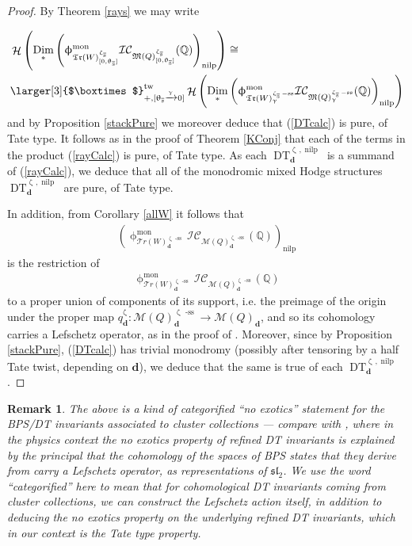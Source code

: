 \documentclass[a4paper,10pt]{amsart}
\newtheorem{remark}[theorem]{Remark}
\newcommand{\dd}{\mathbf{d}}
\newcommand{\Boxtimes}{\mbox{\larger[3]{$\boxtimes$}}}
\newcommand{\QQ}{\mathbb{Q}}
\newcommand{\WW}{\mathcal{T}r(W)}
\newcommand{\WWW}{\mathfrak{Tr}(W)}
\newcommand{\Mst}{\mathfrak{M}}
\newcommand{\Msp}{\mathcal{M}}
\newcommand{\ICS}{\mathcal{IC}}
\newcommand{\phim}[1]{\phi^{\mon}_{#1}}
\renewcommand{\theta}{\uptheta}
\renewcommand{\gamma}{\upgamma}
\renewcommand{\zeta}{\upzeta}
\renewcommand{\phi}{\upphi}
\DeclareMathOperator{\sst}{-ss}
\DeclareMathOperator{\nilp}{nilp}
\DeclareMathOperator{\Dim}{Dim}
\DeclareMathOperator{\tw}{tw}
\DeclareMathOperator{\mon}{mon}
\DeclareMathOperator{\DT}{DT}
\DeclareMathOperator{\Ss}{\overline{s}}
\DeclareMathOperator{\Ho}{\mathcal{H}}
\begin{document}
\begin{proof}
By Theorem \ref{rays} we may write

\begin{align}\label{DTcalc}
&\Ho\left(\Dim_*\left(\phim{\WWW^{\zeta_{\Ss}}_{[0,\theta_{\Ss}]}}\ICS_{\Mst(Q)_{[0,\theta_{\Ss}]}^{\zeta_{\Ss}}}(\mathbb{Q})\right)_{\nilp}\right)\cong\\&\Boxtimes_{+,[\theta_{\Ss}\xrightarrow{\gamma}0]}^{\tw}\Ho\left(\Dim_*\left(\phim{\WWW^{\zeta_{\Ss}\sst}_{\gamma}}\ICS_{\Mst(Q)^{\zeta_{\Ss}\sst}_{\gamma}}(\mathbb{Q})\right)_{\nilp}\right)\label{rayCalc}
\end{align}
and by Proposition \ref{stackPure} we moreover deduce that (\ref{DTcalc}) is pure, of Tate type.  It follows as in the proof of Theorem \ref{KConj} that each of the terms in the product (\ref{rayCalc}) is pure, of Tate type.  As each $\DT_{\dd}^{\zeta_{\Ss},\nilp}$ is a summand of (\ref{rayCalc}), we deduce that all of the monodromic mixed Hodge structures $\DT_{\dd}^{\zeta_{\Ss},\nilp}$ are pure, of Tate type.  

In addition, from Corollary \ref{allW} it follows that 
\begin{align*}
\left(\phim{\WW^{\zeta_{\Ss}\sst}_{\dd}}\ICS_{\Msp(Q)_{\dd}^{\zeta_{\Ss}\sst}}(\QQ)\right)_{\nilp}
\end{align*}
is the restriction of 
\begin{align*}
\phim{\WW^{\zeta_{\Ss}\sst}_{\dd}}\ICS_{\Msp(Q)_{\dd}^{\zeta_{\Ss}\sst}}(\QQ)
\end{align*}
to a proper union of components of its support, i.e. the preimage of the origin under the proper map $q^{\zeta_{\Ss}}_\dd\colon  \Msp(Q)^{\zeta_{\Ss}\sst}_{\dd}\rightarrow \Msp(Q)_{\dd}$, and so its cohomology carries a Lefschetz operator, as in the proof of \cite[Thm.2.3]{DMSS13}.  Moreover, since by Proposition \ref{stackPure}, (\ref{DTcalc}) has trivial monodromy (possibly after tensoring by a half Tate twist, depending on $\dd$), we deduce that the same is true of each $\DT_{\dd}^{\zeta_{\Ss},\nilp}$.
\end{proof}
\begin{remark}
The above is a kind of categorified ``no exotics'' statement for the BPS/DT invariants associated to cluster collections --- compare with \cite{GeomEng}, where in the physics context the no exotics property of refined DT invariants is explained by the principal that the cohomology of the spaces of BPS states that they derive from carry a Lefschetz operator, as representations of $\mathfrak{sl}_2$.  We use the word ``categorified'' here to mean that for cohomological DT invariants coming from cluster collections, we can construct the Lefschetz action itself, in addition to deducing the no exotics property on the underlying refined DT invariants, which in our context is the Tate type property.
\end{remark}
\end{document}
